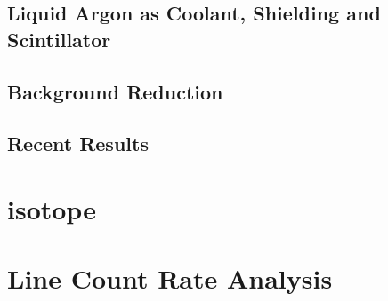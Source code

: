 
\section{Liquid Argon as Coolant, Shielding and Scintillator} 
\label{sec:LArcoolant}


\section{Background Reduction}
\label{sec:BGReduction}



\section{Recent Results}
\label{sec:ResultsofGERDA}




\chapter{\Kr isotope}
\label{sec:Kry85}


 
\chapter{Line Count Rate Analysis}
\label{sec:SAfrom514}


